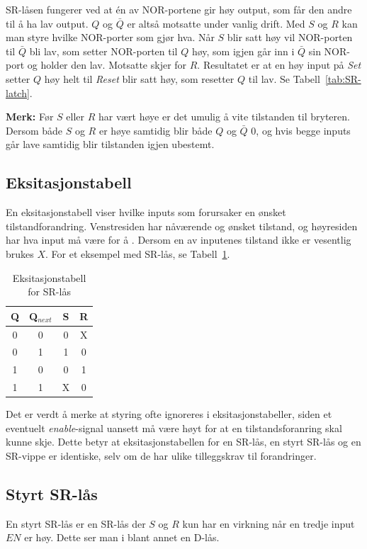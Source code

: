 \documentclass[12pt,a4paper,norsk]{article}
\begin{document}
SR-låsen fungerer ved at én av NOR-portene gir høy output, som får den andre til å
ha lav output. $Q$ og $\bar{Q}$ er altså motsatte under vanlig drift. Med $S$ og $R$
kan man styre hvilke NOR-porter som gjør hva. Når $S$ blir satt høy vil
NOR-porten til $\bar{Q}$ bli lav, som setter NOR-porten til $Q$ høy, som igjen går
inn i $\bar{Q}$ sin NOR-port og holder den lav. Motsatte skjer for $R$. Resultatet er
at en høy input på \textit{Set} setter $Q$ høy helt til \textit{Reset} blir satt
høy, som resetter $Q$ til lav. Se Tabell~\ref{tab:SR-latch}.

\textbf{Merk:} Før $S$ eller $R$ har vært høye er det umulig å vite tilstanden til bryteren.
Dersom både $S$ og $R$ er høye samtidig blir både $Q$ og $\bar{Q}$ $0$, og hvis begge
inputs går lave samtidig blir tilstanden igjen ubestemt.

\subsection{Eksitasjonstabell}
En eksitasjonstabell viser hvilke inputs som forursaker en ønsket
tilstandforandring. Venstresiden har nåværende og ønsket tilstand, og høyresiden
har hva input må være for å . Dersom en av inputenes tilstand ikke er vesentlig brukes $X$. For
et eksempel med SR-lås, se Tabell~\ref{tab:SR_latch_eksit}.

\begin{table}[hbt!]
  \centering
  \begin{tabular}{cc|cc}
    \toprule
    Q & Q$_{next}$ & S & R \\
    \midrule
    0 & 0 & 0 & X \\
    0 & 1 & 1 & 0 \\
    1 & 0 & 0 & 1 \\
    1 & 1 & X & 0
  \end{tabular}
  \caption{Eksitasjonstabell for SR-lås\label{tab:SR_latch_eksit}}
\end{table}

Det er verdt å merke at styring ofte ignoreres i eksitasjonstabeller, siden et
eventuelt \textit{enable}-signal uansett må være høyt for at en
tilstandsforanring skal kunne skje. Dette betyr at eksitasjonstabellen for en
SR-lås, en styrt SR-lås og en SR-vippe er identiske, selv om de har ulike
tilleggskrav til forandringer. 

\subsection{Styrt SR-lås}
En styrt SR-lås er en SR-lås der $S$ og $R$ kun har en virkning når en tredje
input $EN$ er høy. Dette ser man i blant annet en D-lås.
\end{document}
